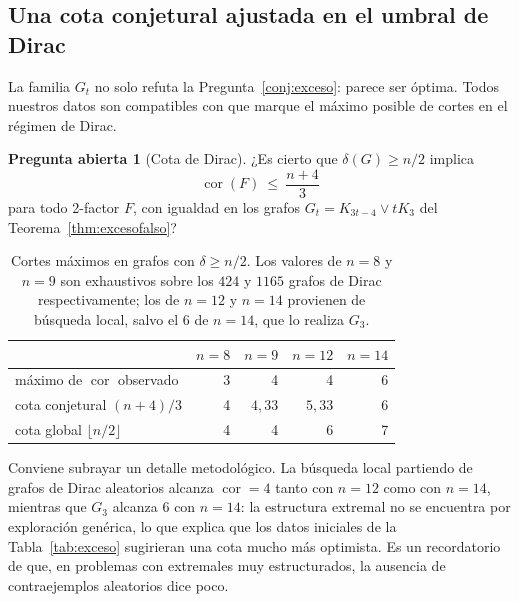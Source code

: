 \documentclass[11pt,a4paper]{article}
\theoremstyle{definition}
\newtheorem{pregunta}[teorema]{Pregunta abierta}
\theoremstyle{remark}
\begin{document}
\subsection{Una cota conjetural ajustada en el umbral de Dirac}\label{sub:cotadirac}

La familia $G_t$ no solo refuta la Pregunta~\ref{conj:exceso}: parece ser óptima. Todos nuestros datos son compatibles con que marque el máximo posible de cortes en el régimen de Dirac.

\begin{pregunta}[Cota de Dirac]\label{conj:cotadirac}
¿Es cierto que $\delta(G)\ge n/2$ implica
\[
\operatorname{cor}(F)\ \le\ \frac{n+4}{3}
\]
para todo 2-factor $F$, con igualdad en los grafos $G_t=K_{3t-4}\vee tK_3$ del Teorema~\ref{thm:excesofalso}?
\end{pregunta}

\begin{table}[h]
\centering
\begin{tabular}{lrrrr}
\toprule
& $n=8$ & $n=9$ & $n=12$ & $n=14$\\
\midrule
máximo de $\operatorname{cor}$ observado & 3 & 4 & 4 & 6\\
cota conjetural $(n+4)/3$ & 4 & $4{,}33$ & $5{,}33$ & 6\\
cota global $\lfloor n/2\rfloor$ & 4 & 4 & 6 & 7\\
\bottomrule
\end{tabular}
\caption{Cortes máximos en grafos con $\delta\ge n/2$. Los valores de $n=8$ y $n=9$ son exhaustivos sobre los $424$ y $1165$ grafos de Dirac respectivamente; los de $n=12$ y $n=14$ provienen de búsqueda local, salvo el $6$ de $n=14$, que lo realiza $G_3$.}\label{tab:cotadirac}
\end{table}

Conviene subrayar un detalle metodológico. La búsqueda local partiendo de grafos de Dirac aleatorios alcanza $\operatorname{cor}=4$ tanto con $n=12$ como con $n=14$, mientras que $G_3$ alcanza $6$ con $n=14$: la estructura extremal no se encuentra por exploración genérica, lo que explica que los datos iniciales de la Tabla~\ref{tab:exceso} sugirieran una cota mucho más optimista. Es un recordatorio de que, en problemas con extremales muy estructurados, la ausencia de contraejemplos aleatorios dice poco.
\end{document}
